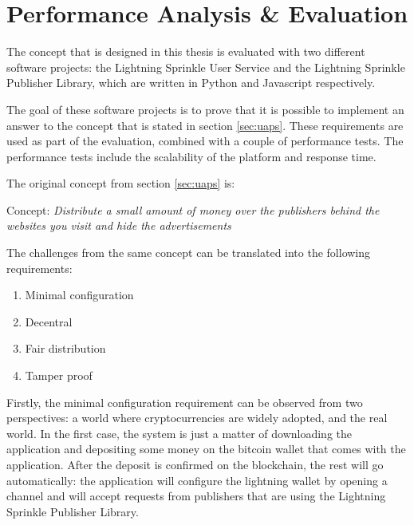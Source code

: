 \chapter{Performance Analysis \& Evaluation}
\label{cha:evaluation}

The concept that is designed in this thesis is evaluated with two different software projects: the Lightning Sprinkle User Service and the Lightning Sprinkle Publisher Library, which are written in Python and Javascript respectively. 

The goal of these software projects is to prove that it is possible to implement an answer to the concept that is stated in section \ref{sec:uaps}. These requirements are used as part of the evaluation, combined with a couple of performance tests. The performance tests include the scalability of the platform and response time. 

\noindent The original concept from section \ref{sec:uaps} is:

\vspace{1em}

Concept: \textit{Distribute a small amount of money over the publishers behind the websites you visit and hide the advertisements}

\vspace{1em}

\noindent The challenges from the same concept can be translated into the following requirements:
\begin{enumerate}
  \item Minimal configuration
  \item Decentral
  \item Fair distribution
  \item Tamper proof
\end{enumerate}


Firstly, the minimal configuration requirement can be observed from two perspectives: a world where cryptocurrencies are widely adopted, and the real world. In the first case, the system is just a matter of downloading the application and depositing some money on the bitcoin wallet that comes with the application. After the deposit is confirmed on the blockchain, the rest will go automatically: the application will configure the lightning wallet by opening a channel and will accept requests from publishers that are using the Lightning Sprinkle Publisher Library. 

